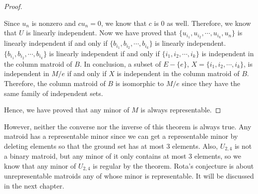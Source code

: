 \begin{proof}
\begin{enumerate}
  Since $u_n$ is nonzero and $c u_n = 0$, we know that $c$ is 0 as well.
  Therefore, we know that $U$ is linearly independent.
  Now we have proved that $\{ u_{i_1}, u_{i_2}, \cdots, u_{i_k}, u_{n} \}$ is linearly independent 
  if and only if $\{ b_{i_1}, b_{i_2}, \cdots, b_{i_k} \}$ is linearly independent.
  $\{ b_{i_1}, b_{i_2}, \cdots, b_{i_k} \}$ is linearly independent if and only if $\{ i_1, i_2, \cdots, i_k \}$ is independent in the column matroid of $B$. 
  In conclusion, a subset of $E - \{ e \}$, $X = \{ i_1, i_2, \cdots, i_k \}$, is independent in $M / e$ if and only if $X$ is independent in the column matroid of $B$.
  Therefore, the column matroid of $B$ is isomorphic to $M / e$ since they have the same family of independent sets.
\end{enumerate}
Hence, we have proved that any minor of $M$ is always representable.
\end{proof}

However, neither the converse nor the inverse of this theorem is always true.
Any matroid has a representable minor since we can get a representable minor by deleting elements so that the ground set has at most 3 elements.
Also, $U_{2, 4}$ is not a binary matroid, but any minor of it only contains at most 3 elements, so we know that any minor of $U_{2,4}$ is regular by the theorem.
Rota's conjecture is about unrepresentable matroids any of whose minor is representable.
It will be discussed in the next chapter.


